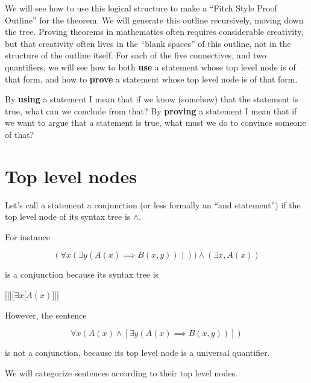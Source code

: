 We will see how to use this logical structure to make a ``Fitch Style Proof Outline''  for the theorem.  We will generate this outline recursively, moving down the tree.  Proving theorems in mathematics often requires considerable creativity, but that creativity often lives in the ``blank spaces'' of this outline, not in the structure of the outline itself.  For each of the five connectives, and two quantifiers, we will see how to both \textbf{use} a statement whose top level node is of that form, and how to \textbf{prove} a statement whose top level node is of that form.

By \textbf{using} a statement I mean that if we know (somehow) that the statement is true, what can we conclude from that?  By \textbf{proving} a statement I mean that if we want to argue that a statement is true, what must we do to convince someone of that?

 

\section{Top level nodes}

Let's call a statement a conjunction (or less formally an ``and statement'') if the top level node of its syntax tree is $\wedge$.

For instance 

$$
(\forall x (\exists y (A(x) \implies B(x,y))))) \wedge (\exists x, A(x))
$$

is a conjunction because its syntax tree is

\begin{center}
	\begin{forest}	
		[$\wedge$[$\forall x$[$\exists y$[$\implies$[$A(x)$][{$B(x,y)$}]]]][$\exists x$[$A(x)$]]]
		\end{forest}
	\end{center}

However, the sentence

$$
\forall x (A(x) \wedge [\exists y (A(x) \implies B(x,y))])
$$

is not a conjunction, because its top level node is a universal quantifier.

We will categorize sentences according to their top level nodes.


